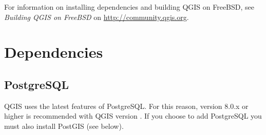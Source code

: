 For information on installing dependencies and building QGIS on FreeBSD,
see \textit{Building QGIS on FreeBSD} on \url{http://community.qgis.org}.

\section{Dependencies}\label{label_dependencies}

\subsection{PostgreSQL}\label{label_postgresql}

QGIS uses the latest features of PostgreSQL. For this reason, version
8.0.x or higher is recommended with QGIS version \CURRENT. If you
choose to add PostgreSQL you must also install PostGIS (see below). 

